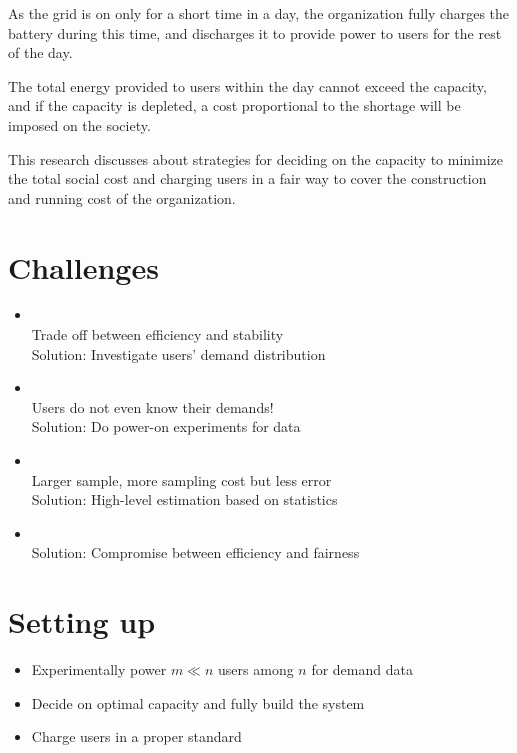\documentclass[a0,portrait]{a0poster}
\begin{document}
\begin{multicols}{2}
As the grid is on only for a short time in a 
day, the organization fully charges the battery during this time, and discharges it to provide power to users for the rest of the day. 

The  total energy provided to users within the day cannot exceed the capacity, and if the capacity is depleted, a cost 
proportional to the shortage will be imposed on the society. 

This research discusses about strategies for
 deciding on the capacity to minimize the total social cost and charging users in a fair way to cover the construction and running cost of the organization.

\section*{Challenges}

\begin{itemize}

\item {} \\
Trade off between efficiency and stability\\ 
  Solution: Investigate users' demand distribution
\item {} \\
Users do not even know their demands! \\
Solution: Do power-on experiments for data
\item {} \\
Larger sample, more sampling cost but less error \\
Solution: High-level estimation based on statistics
\item {} \\
Solution: Compromise between efficiency and fairness

\end{itemize}

\section*{Setting up}



\begin{itemize}



\item Experimentally power $m\ll n$ users among $n$ for demand data
\item Decide on optimal capacity and fully build the system
\item Charge users in a proper standard


\end{itemize}
\end{multicols}
\end{document}
